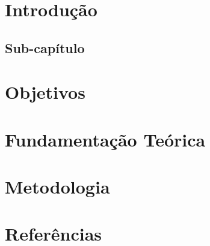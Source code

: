 \documentclass[a4paper,12pt]{article}
\title \DOCTITLE
\author \SURNAMES
\date \FULLDATE
\begin{document}
        
        
        
        
        

        \tableofcontents
        \thispagestyle{empty}
        \newpage
        \section{Introdução}
            \newpage
            \subsection{Sub-capítulo}
                \newpage
        \section{Objetivos}
        \newpage
        \section{Fundamentação Teórica}
        \newpage
        \section{Metodologia}
        \newpage
        \section{Referências}
    
\end{document}
